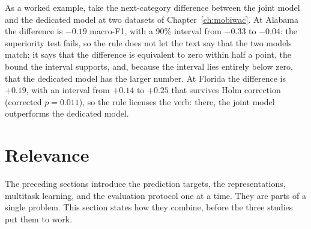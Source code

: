 As a worked example, take the next-category difference between the joint model and
the dedicated model at two datasets of Chapter~\ref{ch:mobiwac}. At Alabama the
difference is $-0.19$ macro-F1, with a 90\% interval from $-0.33$ to $-0.04$: the
superiority test fails, so the rule does not let the text say that the two models match;
it says that the difference is equivalent to zero within half a point, the bound the
interval supports, and, because the interval lies entirely below zero, that the
dedicated model has the larger number. At Florida the difference is $+0.19$, with an
interval from $+0.14$ to $+0.25$ that survives Holm correction (corrected $p=0.011$),
so the rule licenses the verb: there, the joint model outperforms the dedicated model.


\section{Relevance}
\label{sec:fund:relevance}

The preceding sections introduce the prediction targets, the representations, multitask
learning, and the evaluation protocol one at a time. They are parts of a
single problem. This section states how they combine, before the three studies put
them to work.

